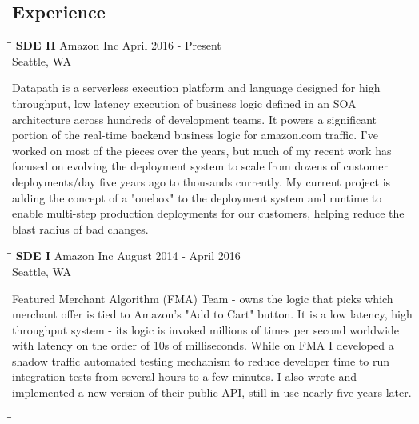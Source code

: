 \documentclass{res}
\begin{document}
\begin{resume}
\section{Experience}
   \vspace{-0.1in}
   \begin{tabbing}%
   \hspace{2.2in}\= \hspace{2.2in}\= \kill %
   {\bf SDE II}  \> Amazon Inc\> April 2016 - Present\\
                          \> Seattle, WA
   \end{tabbing}\vspace{-17pt}
   Datapath is a serverless execution platform and language designed for high throughput, low latency execution of business logic defined in an SOA architecture across hundreds of development teams.  It powers a significant portion of the real-time backend business logic for amazon.com traffic.  I've worked on most of the pieces over the years, but much of my recent work has focused on evolving the deployment system to scale from dozens of customer deployments/day five years ago to thousands currently.  My current project is adding the concept of a "onebox" to the deployment system and runtime to enable multi-step production deployments for our customers, helping reduce the blast radius of bad changes.
   \begin{tabbing}%
   \hspace{2.2in}\= \hspace{2.2in}\= \kill %
   {\bf SDE I}  \> Amazon Inc\> August 2014 - April 2016\\
                          \> Seattle, WA
   \end{tabbing}\vspace{-17pt}
   Featured Merchant Algorithm (FMA) Team - owns the logic that picks which merchant offer is tied to Amazon's "Add to Cart" button. It is a low latency, high throughput system - its logic is invoked millions of times per second worldwide with latency on the order of 10s of milliseconds.  While on FMA I developed a shadow traffic automated testing mechanism to reduce developer time to run integration tests from several hours to a few minutes.  I also wrote and implemented a new version of their public API, still in use nearly five years later.
   \begin{tabbing}
   \hspace{2.2in}\= \hspace{2.2in}\= \kill %

\end{tabbing}
\end{resume}
\end{document}
